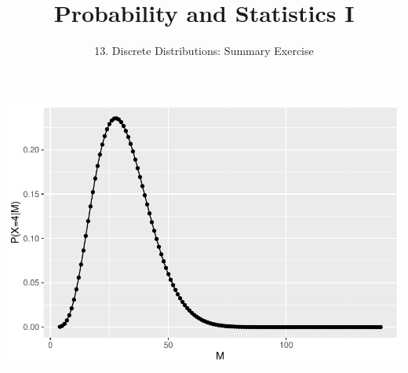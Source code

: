 

\newcommand{\lecturenum}{13}

\title[SS2857]{Probability and Statistics I}
\subtitle{\lecturenum. Discrete Distributions: Summary Exercise}

\date{}






{

\begin{frame}
  \addtocounter{framenumber}{-1}

  \maketitle
\end{frame}
}



\begin{frame}

\begin{center}
\includegraphics[height = .8\textheight]{figure/plot1-1}
\end{center}

\end{frame}


